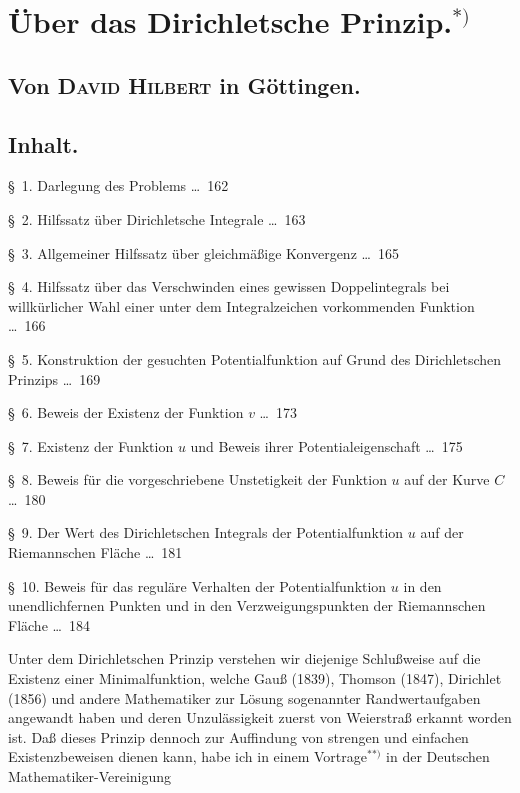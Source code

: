 \documentclass{article}
\begin{document}

\section*{Über das Dirichletsche Prinzip.${}^{*)}$}

\subsection*{Von \textsc{David Hilbert} in Göttingen.}

\subsection*{Inhalt.}

§~1. Darlegung des Problems \dots\ 162

§~2. Hilfssatz über Dirichletsche Integrale \dots\ 163

§~3. Allgemeiner Hilfssatz über gleichmäßige Konvergenz \dots\ 165

§~4. Hilfssatz über das Verschwinden eines gewissen Doppelintegrals bei willkürlicher Wahl einer unter dem Integralzeichen vorkommenden Funktion \dots\ 166

§~5. Konstruktion der gesuchten Potentialfunktion auf Grund des Dirichletschen Prinzips \dots\ 169

§~6. Beweis der Existenz der Funktion $v$ \dots\ 173

§~7. Existenz der Funktion $u$ und Beweis ihrer Potentialeigenschaft \dots\ 175

§~8. Beweis für die vorgeschriebene Unstetigkeit der Funktion $u$ auf der Kurve $C$ \dots\ 180

§~9. Der Wert des Dirichletschen Integrals der Potentialfunktion $u$ auf der Riemannschen Fläche \dots\ 181

§~10. Beweis für das reguläre Verhalten der Potentialfunktion $u$ in den unendlichfernen Punkten und in den Verzweigungspunkten der Riemannschen Fläche \dots\ 184

Unter dem Dirichletschen Prinzip verstehen wir diejenige Schlußweise auf die Existenz einer Minimalfunktion, welche Gauß (1839), Thomson (1847), Dirichlet (1856) und andere Mathematiker zur Lösung sogenannter Randwertaufgaben angewandt haben und deren Unzulässigkeit zuerst von Weierstraß erkannt worden ist. Daß dieses Prinzip dennoch zur Auffindung von strengen und einfachen Existenzbeweisen dienen kann, habe ich in einem Vortrage${}^{**)}$ in der Deutschen Mathematiker-Vereinigung
\end{document}
